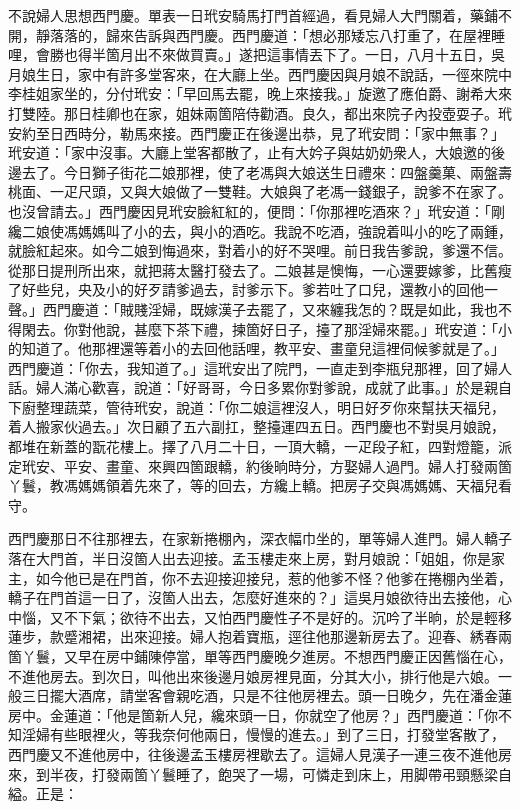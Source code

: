 不說婦人思想西門慶。單表一日玳安騎馬打門首經過，看見婦人大門關着，藥鋪不開，靜落落的，歸來告訴與西門慶。西門慶道：「想必那矮忘八打重了，在屋裡睡哩，會勝也得半箇月出不來做買賣。」遂把這事情丟下了。一日，八月十五日，吳月娘生日，家中有許多堂客來，在大廳上坐。西門慶因與月娘不說話，一徑來院中李桂姐家坐的，分付玳安：「早回馬去罷，晚上來接我。」旋邀了應伯爵、謝希大來打雙陸。那日桂卿也在家，姐妹兩箇陪侍勸酒。良久，都出來院子內投壺耍子。玳安約至日西時分，勒馬來接。西門慶正在後邊出恭，見了玳安問：「家中無事？」玳安道：「家中沒事。大廳上堂客都散了，止有大妗子與姑奶奶衆人，大娘邀的後邊去了。今日獅子街花二娘那裡，使了老馮與大娘送生日禮來：{}四盤羹菓、兩盤壽桃面、一疋尺頭，又與大娘做了一雙鞋。大娘與了老馮一錢銀子，說爹不在家了。也沒曾請去。」{}西門慶因見玳安臉紅紅的，便問：「你那裡吃酒來？」玳安道：「剛纔二娘使馮媽媽叫了小的去，與小的酒吃。我說不吃酒，強說着叫小的吃了兩鍾，就臉紅起來。{}如今二娘到悔過來，對着小的好不哭哩。前日我告爹說，爹還不信。從那日提刑所出來，就把蔣太醫打發去了。二娘甚是懊悔，一心還要嫁爹，比舊瘦了好些兒，央及小的好歹請爹過去，討爹示下。爹若吐了口兒，還教小的回他一聲。」西門慶道：「賊賤淫婦，既嫁漢子去罷了，又來纏我怎的？既是如此，我也不得閑去。你對他說，甚麼下茶下禮，揀箇好日子，擡了那淫婦來罷。」{}玳安道：「小的知道了。他那裡還等着小的去回他話哩，教平安、畫童兒這裡伺候爹就是了。」西門慶道：「你去，我知道了。」這玳安出了院門，一直走到李瓶兒那裡，回了婦人話。婦人滿心歡喜，說道：「好哥哥，今日多累你對爹說，成就了此事。」於是親自下廚整理蔬菜，管待玳安，說道：「你二娘這裡沒人，明日好歹你來幫扶天福兒，着人搬家伙過去。」次日顧了五六副扛，整擡運四五日。西門慶也不對吳月娘說，都堆在新蓋的翫花樓上。擇了八月二十日，一頂大轎，一疋段子紅，四對燈籠，派定玳安、平安、畫童、來興四箇跟轎，約後晌時分，方娶婦人過門。婦人打發兩箇丫鬟，教馮媽媽領着先來了，等的回去，方纔上轎。把房子交與馮媽媽、天福兒看守。

西門慶那日不往那裡去，在家新捲棚內，深衣幅巾坐的，單等婦人進門。婦人轎子落在大門首，半日沒箇人出去迎接。{}孟玉樓走來上房，對月娘說：「姐姐，你是家主，如今他已是在門首，你不去迎接迎接兒，惹的他爹不怪？他爹在捲棚內坐着，轎子在門首這一日了，沒箇人出去，怎麼好進來的？」這吳月娘欲待出去接他，心中惱，又不下氣；欲待不出去，又怕西門慶性子不是好的。沉吟了半晌，於是輕移蓮步，款蹙湘裙，出來迎接。婦人抱着寶瓶，逕往他那邊新房去了。迎春、綉春兩箇丫鬟，又早在房中鋪陳停當，單等西門慶晚夕進房。不想西門慶正因舊惱在心，不進他房去。到次日，叫他出來後邊月娘房裡見面，分其大小，排行他是六娘。一般三日擺大酒席，請堂客會親吃酒，只是不往他房裡去。頭一日晚夕，先在潘金蓮房中。金蓮道：「他是箇新人兒，{}纔來頭一日，你就空了他房？」西門慶道：「你不知淫婦有些眼裡火，等我奈何他兩日，慢慢的進去。」到了三日，打發堂客散了，西門慶又不進他房中，往後邊孟玉樓房裡歇去了。這婦人見漢子一連三夜不進他房來，到半夜，打發兩箇丫鬟睡了，飽哭了一場，可憐走到床上，用脚帶弔頸懸梁自縊。{}正是：

